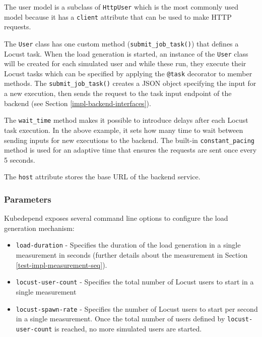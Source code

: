 The user model is a subclass of \texttt{HttpUser} which is the most commonly used model because it has a \texttt{client} attribute that can be used to make HTTP requests.

The \texttt{User} class has one custom method (\texttt{submit\_job\_task()}) that defines a Locust task. When the load generation is started, an instance of the \texttt{User} class will be created for each simulated user and while these run, they execute their Locust tasks which can be specified \eg by applying the \texttt{@task} decorator to member methods. The \texttt{submit\_job\_task()} creates a JSON object specifying the input for a new execution, then sends the request to the task input endpoint of the backend (see Section \ref{impl-backend-interfaces}).

The \texttt{wait\_time} method makes it possible to introduce delays after each Locust task execution. In the above example, it sets how many time to wait between sending inputs for new executions to the backend. The built-in \texttt{constant\_pacing} method is used for an adaptive time that ensures the requests are sent once every 5 seconds.

The \texttt{host} attribute stores the base URL of the backend service.


\subsubsection{Parameters}

Kubedepend exposes several command line options to configure the load generation mechanism:

\begin{itemize}
	\item \texttt{load-duration} - Specifies the duration of the load generation in a single measurement in seconds (further details about the measurement in Section \ref{test-impl-measurement-seq}). 
	\item \texttt{locust-user-count} - Specifies the total number of Locust users to start in a single measurement
	\item \texttt{locust-spawn-rate} - Specifies the number of Locust users to start per second in a single measurement. Once the total number of users defined by \texttt{locust-user-count} is reached, no more simulated users are started. 
\end{itemize}

